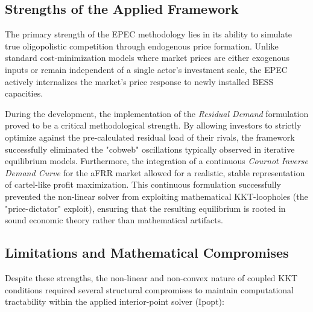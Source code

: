 \subsection{Strengths of the Applied Framework}
The primary strength of the EPEC methodology lies in its ability to simulate true oligopolistic competition through endogenous price formation. Unlike standard cost-minimization models where market prices are either exogenous inputs or remain independent of a single actor's investment scale, the EPEC actively internalizes the market's price response to newly installed BESS capacities. 

During the development, the implementation of the \textit{Residual Demand} formulation proved to be a critical methodological strength. By allowing investors to strictly optimize against the pre-calculated residual load of their rivals, the framework successfully eliminated the "cobweb" oscillations typically observed in iterative equilibrium models. Furthermore, the integration of a continuous \textit{Cournot Inverse Demand Curve} for the aFRR market allowed for a realistic, stable representation of cartel-like profit maximization. This continuous formulation successfully prevented the non-linear solver from exploiting mathematical KKT-loopholes (the "price-dictator" exploit), ensuring that the resulting equilibrium is rooted in sound economic theory rather than mathematical artifacts.

\subsection{Limitations and Mathematical Compromises}
Despite these strengths, the non-linear and non-convex nature of coupled KKT conditions required several structural compromises to maintain computational tractability within the applied interior-point solver (Ipopt):

